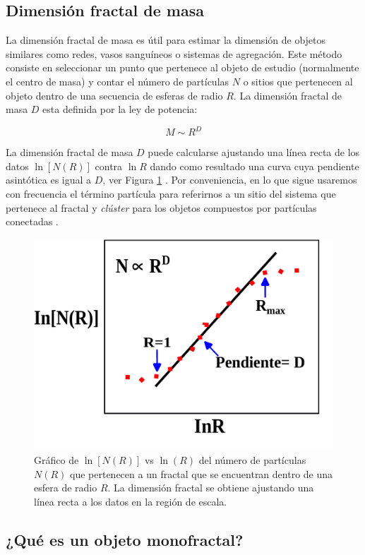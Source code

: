 \subsection{Dimensi\'{o}n fractal de masa}
\label{masa-radio}

La dimensi\'{o}n fractal de masa es \'{u}til para estimar la dimensi\'{o}n de objetos similares como redes, vasos sangu\'{i}neos o sistemas de agregaci\'{o}n. Este m\'{e}todo consiste en seleccionar un punto que pertenece al objeto de estudio (normalmente el centro de masa) y contar el n\'{u}mero de part\'{i}culas $N$ o sitios que pertenecen al objeto dentro de una secuencia de esferas de radio $R$. La dimensi\'{o}n fractal de masa $D$ esta definida por la ley de potencia:

\begin{equation}
	M \sim R^{D}
\end{equation}


La dimensi\'{o}n fractal de masa $D$ puede calcularse ajustando una l\'{i}nea recta de los datos $\ln[N(R)]$ contra $\ln R$ dando como resultado una curva cuya pendiente asint\'{o}tica es igual a $D$, ver Figura \ref{fig:D-Fractal} . Por conveniencia, en lo que sigue usaremos con frecuencia el t\'{e}rmino part\'{i}cula para referirnos a un sitio del sistema que pertenece al fractal y \textit{cl\'{u}ster} para los objetos compuestos por part\'{i}culas conectadas \cite{Vicsek1992}.


\begin{figure}[H]
	\begin{center}
		\includegraphics[width=0.5\linewidth]{graphs/dimension-fractal}
		\caption{Gr\'{a}fico de $\ln[N(R)]$ vs $\ln(R)$ del n\'{u}mero de part\'{i}culas $N(R)$ que pertenecen a un fractal que se encuentran dentro de una esfera de radio $R$. La dimensi\'{o}n fractal se obtiene ajustando una l\'{i}nea recta a los datos en la regi\'{o}n de escala.}
		\label{fig:D-Fractal}
	\end{center}
\end{figure}


\subsection*{¿Qu\'{e} es un objeto monofractal?}

